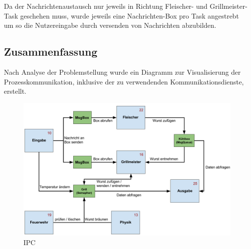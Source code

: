 Da der Nachrichtenaustausch nur jeweils in Richtung Fleischer- und Grillmeister-Task geschehen muss,
wurde jeweils eine Nachrichten-Box pro Task angestrebt um so die Nutzereingabe durch versenden von Nachrichten abzubilden.

\subsection{Zusammenfassung}

Nach Analyse der Problemstellung wurde ein Diagramm zur Visualisierung der Prozesskommunikation, inklusive der zu verwendenden Kommunikationsdienste, erstellt.

\begin{figure}[!ht]
  \centering
  \includegraphics[width=\textwidth]{Bilder/diagramm_ipc.png}
  \caption{IPC}
\end{figure}
